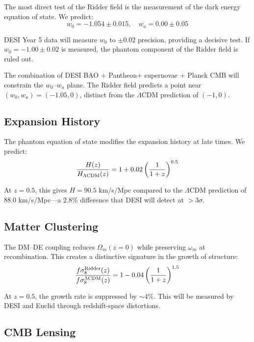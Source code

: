 \documentclass[twocolumn,showpacs,preprintnumbers,amsmath,amssymb,prd]{revtex4-2}
\begin{document}
The most direct test of the Ridder field is the measurement of the dark energy equation of state. We predict:
\begin{equation}
w_0 = -1.054 \pm 0.015, \quad w_a = 0.00 \pm 0.05
\end{equation}

DESI Year 5 data will measure $w_0$ to $\pm 0.02$ precision, providing a decisive test. If $w_0 = -1.00 \pm 0.02$ is measured, the phantom component of the Ridder field is ruled out.

The combination of DESI BAO + Pantheon+ supernovae + Planck CMB will constrain the $w_0$--$w_a$ plane. The Ridder field predicts a point near $(w_0, w_a) = (-1.05, 0)$, distinct from the $\Lambda$CDM prediction of $(-1, 0)$.

\subsection{Expansion History}

The phantom equation of state modifies the expansion history at late times. We predict:
\begin{equation}
\frac{H(z)}{H_{\Lambda\rm CDM}(z)} = 1 + 0.02\left(\frac{1}{1+z}\right)^{0.5}
\end{equation}

At $z = 0.5$, this gives $H = 90.5$ km/s/Mpc compared to the $\Lambda$CDM prediction of $88.0$ km/s/Mpc---a $2.8\%$ difference that DESI will detect at $>3\sigma$.

\subsection{Matter Clustering}

The DM--DE coupling reduces $\Omega_m(z=0)$ while preserving $\omega_m$ at recombination. This creates a distinctive signature in the growth of structure:
\begin{equation}
\frac{f\sigma_8^{\rm Ridder}(z)}{f\sigma_8^{\Lambda\rm CDM}(z)} = 1 - 0.04\left(\frac{1}{1+z}\right)^{1.5}
\end{equation}

At $z = 0.5$, the growth rate is suppressed by $\sim 4\%$. This will be measured by DESI and Euclid through redshift-space distortions.

\subsection{CMB Lensing}
\end{document}
